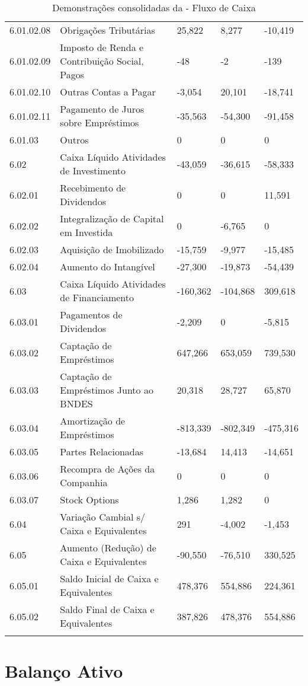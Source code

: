 \begin{center}
\begin{longtable}{p{}|p{}|p{}|p{}|p{}}
6.01.02.08 & Obrigações Tributárias & 25,822 & 8,277 & -10,419\tabularnewline
6.01.02.09 & Imposto de Renda e Contribuição Social, Pagos & -48 & -2 & -139\tabularnewline
6.01.02.10 & Outras Contas a Pagar & -3,054 & 20,101 & -18,741\tabularnewline
6.01.02.11 & Pagamento de Juros sobre Empréstimos & -35,563 & -54,300 & -91,458\tabularnewline
6.01.03 & Outros & 0 & 0 & 0\tabularnewline
6.02 & Caixa Líquido Atividades de Investimento & -43,059 & -36,615 & -58,333\tabularnewline
6.02.01 & Recebimento de Dividendos & 0 & 0 & 11,591\tabularnewline
6.02.02 & Integralização de Capital em Investida & 0 & -6,765 & 0\tabularnewline
6.02.03 & Aquisição de Imobilizado & -15,759 & -9,977 & -15,485\tabularnewline
6.02.04 & Aumento do Intangível & -27,300 & -19,873 & -54,439\tabularnewline
6.03 & Caixa Líquido Atividades de Financiamento & -160,362 & -104,868 & 309,618\tabularnewline
6.03.01 & Pagamentos de Dividendos & -2,209 & 0 & -5,815\tabularnewline
6.03.02 & Captação de Empréstimos & 647,266 & 653,059 & 739,530\tabularnewline
6.03.03 & Captação de Empréstimos Junto ao BNDES & 20,318 & 28,727 & 65,870\tabularnewline
6.03.04 & Amortização de Empréstimos & -813,339 & -802,349 & -475,316\tabularnewline
6.03.05 & Partes Relacionadas & -13,684 & 14,413 & -14,651\tabularnewline
6.03.06 & Recompra de Ações da Companhia & 0 & 0 & 0\tabularnewline
6.03.07 & Stock Options & 1,286 & 1,282 & 0\tabularnewline
6.04 & Variação Cambial s/ Caixa e Equivalentes & 291 & -4,002 & -1,453\tabularnewline
6.05 & Aumento (Redução) de Caixa e Equivalentes & -90,550 & -76,510 & 330,525\tabularnewline
6.05.01 & Saldo Inicial de Caixa e Equivalentes & 478,376 & 554,886 & 224,361\tabularnewline
6.05.02 & Saldo Final de Caixa e Equivalentes & 387,826 & 478,376 & 554,886\tabularnewline
\hline 
\caption{Demonstrações consolidadas da \nomeCompletoPositivo{} - Fluxo de Caixa}
\end{longtable}
\vspace*{-40pt}
\par\end{center}

\section{Balanço Ativo}

